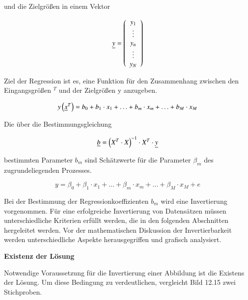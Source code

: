 \noindent und die Zielgr\"{o}{\ss}en in einem Vektor 

\begin{equation}\label{eq:thirteeneightyfive}
\underline{y}=\left(\begin{array}{c} {y_{1} } \\ {\vdots } \\ {y_{n} } \\ {\vdots } \\ {y_{N} } \end{array}\right)
\end{equation}

\noindent Ziel der Regression ist es, eine Funktion f\"{u}r den Zusammenhang zwischen den Eingangsgr\"{o}{\ss}en $^{T}$ und der Zielgr\"{o}{\ss}en y anzugeben.

\begin{equation}\label{eq:thirteeneightysix}
y\left(\underline{x}^{T} \right)=b_{0} +b_{1} \cdot x_{1} +\ldots +b_{m} \cdot x_{m} +\ldots +b_{M} \cdot x_{M}
\end{equation}

\noindent Die \"{u}ber die Bestimmungsgleichung 

\begin{equation}\label{eq:thirteeneightyseven}
\underline{b}=\left(X^{T} \cdot X\right)^{-1} \cdot X^{T} \cdot \underline{y}
\end{equation}

\noindent bestimmten Parameter $b_{m}$ sind Sch\"{a}tzwerte f\"{u}r die Parameter $\beta_{m}$ des zugrundeliegenden Prozesses.

\begin{equation}\label{eq:thirteeneightyeight}
y=\beta _{0} +\beta _{1} \cdot x_{1} +\ldots +\beta _{m} \cdot x_{m} +\ldots +\beta _{M} \cdot x_{M} +e
\end{equation}

\noindent Bei der Bestimmung der Regressionkoeffizienten $b_{m}$ wird eine Invertierung vorgenommen. F\"{u}r eine erfolgreiche Invertierung von Datens\"{a}tzen m\"{u}ssen unterschiedliche Kriterien erf\"{u}llt werden, die in den folgenden Abschnitten hergeleitet werden. Vor der mathematischen Diskussion der Invertierbarkeit werden unterschiedliche Aspekte herausgegriffen und grafisch analysiert.\bigskip

{\selectfont
\noindent\textbf{Existenz der L\"{o}sung}} \smallskip

\noindent Notwendige Voraussetzung f\"{u}r die Invertierung einer Abbildung ist die Existens der L\"{o}sung. Um diese Bedingung zu verdeutlichen, vergleicht Bild 12.15 zwei Stichproben.

